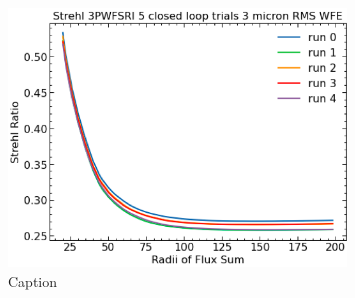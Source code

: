 \documentclass[12pt]{spieman}  %
\begin{document}
\begin{spacing}{2}
\begin{figure}
    \centering
    \includegraphics[width=0.8\textwidth]{StrehlVsRadiiExample.png}
    \caption{Caption}
    \label{fig:StrehlVsRadiiExample}
\end{figure}






\end{spacing}
\end{document}
